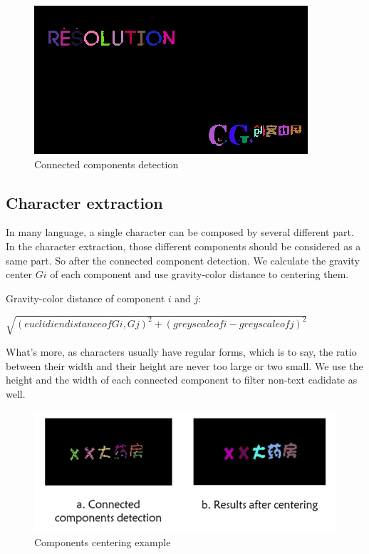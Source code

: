 \documentclass[paper=a4, french, 11pt]{scrartcl}
\begin{document}
\begin{figure}[h]
\begin{center}
   \includegraphics[width=0.75\linewidth]{connected_components_example.png}
\end{center}
\vspace{-4ex}
\caption{Connected components detection}
\label{fig:heatmap}
\end{figure}

\subsection{Character extraction} \mbox{} \vspace{-0.5cm}

In many language, a single character can be composed by several different part. In the character extraction, those different components should be considered as a same part. So after the connected component detection. We calculate the gravity center $G{i}$ of each component and use gravity-color distance to centering them.

Gravity-color distance of component $ i$ and $ j$:

$\sqrt{(euclidien distance of G{i}, G{j})^2 + (greyscale of i - greyscale of j)^2}$

What's more, as characters usually have regular forms, which is to say, the ratio between their width and their height are never too large or two small. We use the height and the width of each connected component to filter non-text cadidate as well. 

\begin{figure}[h]
\begin{center}
   \includegraphics[width=0.9\linewidth]{component_centering_example.png}
\end{center}
\vspace{-4ex}
\caption{Components centering example}
\label{fig:heatmap}
\end{figure} 
\end{document}
